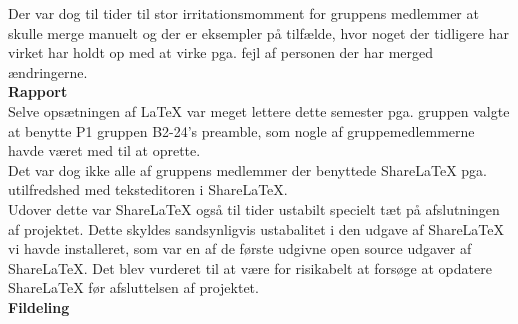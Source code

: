 Der var dog til tider til stor irritationsmomment for gruppens medlemmer at skulle merge manuelt og der er eksempler på tilfælde, hvor noget der tidligere har virket har holdt op med at virke pga. fejl af personen der har merged ændringerne.\\


\textbf{Rapport}\\ %
Selve opsætningen af LaTeX var meget lettere dette semester pga. gruppen valgte at benytte P1 gruppen B2-24's preamble, som nogle af gruppemedlemmerne havde været med til at oprette.\\

Det var dog ikke alle af gruppens medlemmer der benyttede ShareLaTeX pga. utilfredshed med teksteditoren i ShareLaTeX.\\

Udover dette var ShareLaTeX også til tider ustabilt specielt tæt på afslutningen af projektet. Dette skyldes sandsynligvis ustabalitet i den udgave af ShareLaTeX vi havde installeret, som var en af de første udgivne open source udgaver af ShareLaTeX. Det blev vurderet til at være for risikabelt at forsøge at opdatere ShareLaTeX før afsluttelsen af projektet.\\

\textbf{Fildeling}\\ %
